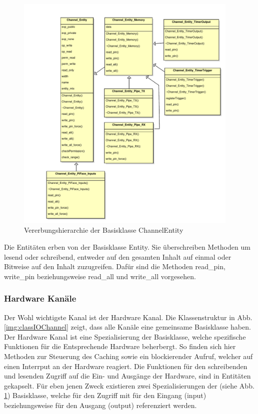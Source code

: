 \begin{figure}[H]
	\begin{center}
		\includegraphics[width=0.95\textwidth ,clip]{./code/ChannelEntity.pdf}
		\caption{Vererbungshierarchie der Basisklasse ChannelEntity}
		\label{img:classChannelEntity}
	\end{center} 
\end{figure}	

Die Entitäten erben von der Basisklasse Entity. Sie überschreiben Methoden um lesend oder schreibend, entweder auf den gesamten Inhalt auf einmal oder Bitweise auf den Inhalt zuzugreifen. Dafür sind die Methoden read\_pin, write\_pin beziehungsweise read\_all und write\_all vorgesehen. 



\subsubsection{Hardware Kanäle}
Der Wohl wichtigste Kanal ist der Hardware Kanal. Die Klassenstruktur in Abb. \ref{img:classIOChannel} zeigt, dass alle Kanäle eine gemeinsame Basisklasse haben. Der Hardware Kanal ist eine Spezialisierung der Basisklasse, welche spezifische Funktionen für die Entsprechende Hardware beherbergt. So finden sich hier Methoden zur Steuerung des Caching sowie ein blockierender Aufruf, welcher auf einen Interrput an der Hardware reagiert. Die Funktionen für den schreibenden und lesenden Zugriff auf die Ein- und Ausgänge der Hardware, sind in Entitäten gekapselt. Für eben jenen Zweck existieren zwei Spezialisierungen der  (siehe Abb. \ref{img:classChannelEntity}) Basisklasse, welche für den Zugriff mit  für den Eingang (input) beziehungsweise  für den Ausgang (output) referenziert werden.   

